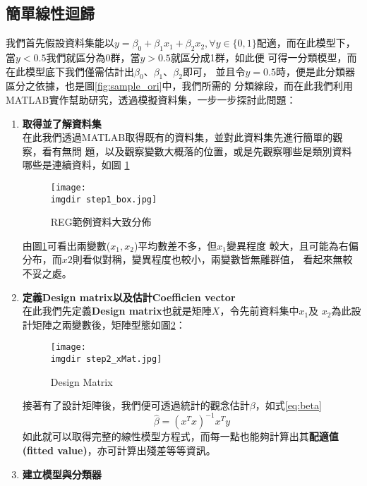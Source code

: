 		\subsection{簡單線性迴歸}
			我們首先假設資料集能以$y=\beta_0+ \beta_1 x_1+\beta_2 x_2,\forall y \in 					\{0,1\}$配適，而在此模型下，當$y<0.5$我們就區分為0群，當$y>0.5$就區分成1群，如此便				可得一分類模型，而在此模型底下我們僅需估計出$\beta_0$、$\beta_1$、$\beta_2$即可，				並且令$y=0.5$時，便是此分類器區分之依據，也是圖\ref{fig:sample_ori}中，我們所需的				分類線段，而在此我們利用MATLAB實作幫助研究，透過模擬資料集，一步一步探討此問題：\\		
			\begin{enumerate}[Step 1：]
				\item {\textbf{取得並了解資料集}\\
					在此我們透過MATLAB取得既有的資料集，並對此資料集先進行簡單的觀察，看有無問						題，以及觀察變數大概落的位置，或是先觀察哪些是類別資料哪些是連續資料，如圖							\ref{fig:step1}
					\begin{figure}[H]	
		 		 		\centering	 			 	 
   				 		\texttt{[image: \\imgdir step1\_box.jpg]} 
   			 			\caption{REG範例資料大致分佈}   		
   			 			\label{fig:step1}   			 		 
					\end{figure}
					由圖\ref{fig:step1}可看出兩變數($x_1,x_2$)平均數差不多，但$x_1$變異程度						較大，且可能為右偏分布，而$x2$則看似對稱，變異程度也較小，兩變數皆無離群值，						看起來無較不妥之處。
				}
				\item {\textbf{定義Design matrix以及估計Coefficien vector}\\
					在此我們先定義\textbf{Design matrix}也就是矩陣$X$，令先前資料集中$x_1$及						$x_2$為此設計矩陣之兩變數後，矩陣型態如圖\ref{fig:step2}：
					\begin{figure}[H]	
		 		 		\centering	 			 	 
   				 		\texttt{[image: \\imgdir step2\_xMat.jpg]} 
   			 			\caption{Design Matrix}   		
   			 			\label{fig:step2}   			 		 
					\end{figure}
					接著有了設計矩陣後，我們便可透過統計的觀念估計$\beta$，如式\ref{eq:beta}
					\begin{equation}\label{eq:beta}
 						\hat{\beta}=(x^T x)^{-1}x^T y
 					\end{equation}
 					如此就可以取得完整的線性模型方程式，而每一點也能夠計算出其\textbf{配適值							(fitted value)}，亦可計算出殘差等等資訊。
				}
				\item {\textbf{建立模型與分類器}\\
}
\end{enumerate}
